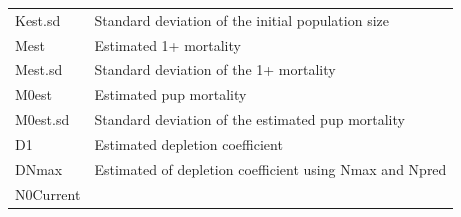 \documentclass[
]{article}
\begin{document}
\begin{longtable}[]{@{}ll@{}}
\begin{minipage}[t]{0.31\columnwidth}
Kest.sd\strut
\end{minipage} & \begin{minipage}[t]{0.38\columnwidth}\raggedright
Standard deviation of the initial population size\strut
\end{minipage}\tabularnewline
\begin{minipage}[t]{0.31\columnwidth}\raggedright
Mest\strut
\end{minipage} & \begin{minipage}[t]{0.38\columnwidth}\raggedright
Estimated 1+ mortality\strut
\end{minipage}\tabularnewline
\begin{minipage}[t]{0.31\columnwidth}\raggedright
Mest.sd\strut
\end{minipage} & \begin{minipage}[t]{0.38\columnwidth}\raggedright
Standard deviation of the 1+ mortality\strut
\end{minipage}\tabularnewline
\begin{minipage}[t]{0.31\columnwidth}\raggedright
M0est\strut
\end{minipage} & \begin{minipage}[t]{0.38\columnwidth}\raggedright
Estimated pup mortality\strut
\end{minipage}\tabularnewline
\begin{minipage}[t]{0.31\columnwidth}\raggedright
M0est.sd\strut
\end{minipage} & \begin{minipage}[t]{0.38\columnwidth}\raggedright
Standard deviation of the estimated pup mortality\strut
\end{minipage}\tabularnewline
\begin{minipage}[t]{0.31\columnwidth}\raggedright
D1\strut
\end{minipage} & \begin{minipage}[t]{0.38\columnwidth}\raggedright
Estimated depletion coefficient\strut
\end{minipage}\tabularnewline
\begin{minipage}[t]{0.31\columnwidth}\raggedright
DNmax\strut
\end{minipage} & \begin{minipage}[t]{0.38\columnwidth}\raggedright
Estimated of depletion coefficient using Nmax and Npred\strut
\end{minipage}\tabularnewline
\begin{minipage}[t]{0.31\columnwidth}\raggedright
N0Current\strut
\end{minipage} & \begin{minipage}[t]{0.38\columnwidth}\raggedright

\end{minipage}
\end{longtable}
\end{document}
